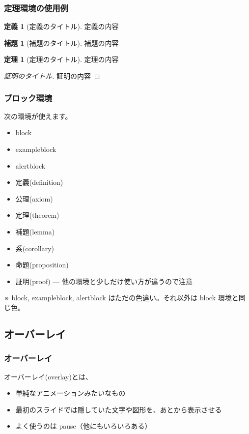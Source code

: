 \documentclass[dvipdfmx,cjk,xcolor=dvipsnames,envcountsect,notheorems,12pt]{beamer}
\theoremstyle{definition}
\newtheorem{definition}{定義}
\newtheorem{theorem}{定理}
\newtheorem{lemma}{補題}
\begin{document}
\begin{frame}
  \frametitle{定理環境の使用例}
  \renewcommand{\thedefinition}{1.1}%
  \begin{definition}[定義のタイトル]
    定義の内容
  \end{definition}
  \vfill
  \renewcommand{\thelemma}{2.2}%
  \begin{lemma}[補題のタイトル]
    補題の内容
  \end{lemma}
  \vfill
  \renewcommand{\thetheorem}{3.4}%
  \begin{theorem}[定理のタイトル]
    定理の内容
  \end{theorem}
  \vfill
  \begin{proof}[証明のタイトル]
    証明の内容
  \end{proof}
\end{frame}

\begin{frame}
  \frametitle{ブロック環境}
  次の環境が使えます。
  \begin{itemize}
  \item block
  \item exampleblock
  \item alertblock
  \item 定義(definition)
  \item 公理(axiom)
  \item 定理(theorem)
  \item 補題(lemma)
  \item 系(corollary)
  \item 命題(proposition)
  \item 証明(proof) --- 他の環境と少しだけ使い方が違うので注意
  \end{itemize}
  ※ block, exampleblock, alertblock はただの色違い。それ以外は block 環境と同じ色。
\end{frame}

\subsection{オーバーレイ}

\begin{frame}
  \frametitle{オーバーレイ}
  \alert{オーバーレイ(overlay)}とは、
  \begin{itemize}
    \pause%
    \item 単純なアニメーションみたいなもの
    \pause
    \item 最初のスライドでは隠していた文字や図形を、あとから表示させる
    \pause
    \item よく使うのは pause（他にもいろいろある）
  \end{itemize}
\end{frame}
\end{document}
